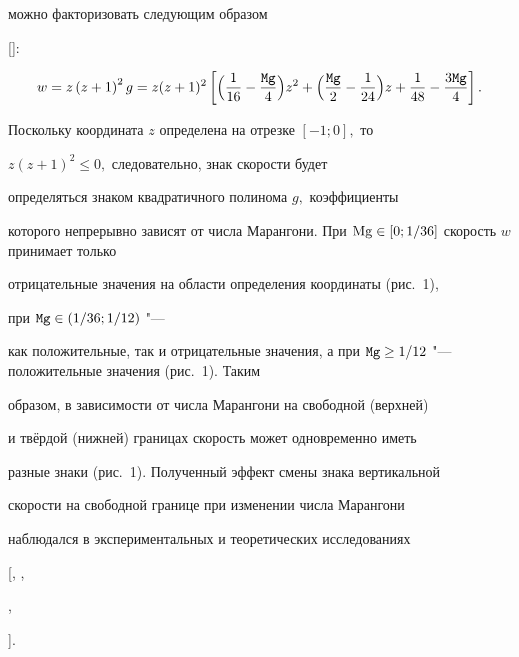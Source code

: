 можно факторизовать следующим образом

[]:

$$

w=z\left(z+1\right)^2 g=z(z+1)^2

\left[\Bigl(\frac{1}{16}- \frac{{\tt Mg}}{4}\Bigr)z^2+\Bigl(\frac{{\tt Mg}}{2}-\frac{1}{24}

\Bigr)z+\frac{1}{48}-\frac{\text{3\tt Mg}}{4}\right].

$$



Поскольку координата $z$ определена на отрезке $[-1;0 ],$ то

$z(z+1)^2\leq 0, $ следовательно, знак скорости будет

определяться  знаком квадратичного полинома $g,$ коэффициенты

которого непрерывно зависят от числа Марангони. При ${\rm

Mg}\in\left[0;{1}/{36} \right]$ скорость $w$ принимает только

отрицательные значения на области определения координаты (рис.~1),

при ${\tt Mg}\in\left({1}/{36};{1}/{12} \right) $  "---

как положительные, так и отрицательные значения, а при ${\tt Mg}\geq{1}/{12} $  "--- положительные значения (рис.~1). Таким

образом, в зависимости от числа Марангони на свободной (верхней)

и твёрдой (нижней) границах скорость может одновременно иметь

разные знаки (рис.~1). Полученный эффект смены знака вертикальной

скорости на свободной границе при изменении числа Марангони

наблюдался в экспериментальных и теоретических исследованиях

[, ,

,

].





